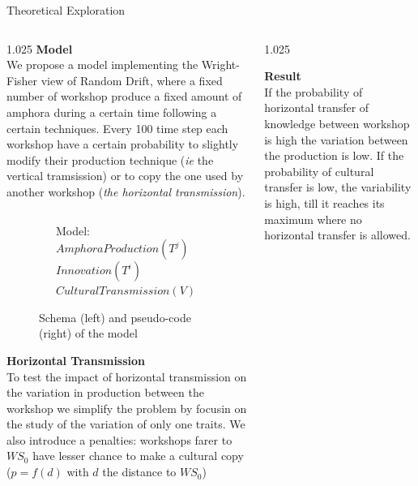 \documentclass[final]{beamer}
\newlength{\sepwid}
\newlength{\onecolwid}
\newlength{\twocolwid}
\begin{document}
\begin{frame}[t]
\begin{columns}[t]
\begin{column}{\twocolwid}
\begin{block}{Theoretical Exploration}
\begin{columns}[t,totalwidth=\twocolwid]
\begin{column}{1.025\onecolwid}
{\textbf{Model}}\\
\justify
We propose a model implementing the Wright-Fisher view of Random Drift, where a fixed number of workshop produce a fixed amount of amphora during a certain time following a certain techniques. Every 100 time step each workshop have a certain probability to slightly modify their production technique (\emph{ie} the vertical tramsission) or to copy the one used by another workshop (\emph{the horizontal transmission}). 
	\begin{figure}
\begin{columns}
    \begin{column}{.6\textwidth}
	    \centering
	\resizebox{\textwidth}{!}{
	    
}
	    \label{fig:mod}
    \end{column}
    \begin{column}{.4\textwidth}
	\begin{algorithmic}
	    \tiny
	    \State Model:
	    \State $AmphoraProduction(T^j)$
	    \State $Innovation(T^i)$
	    \State $CulturalTransmission(V)$
	    \EndIf
	    \EndFor
	    \EndLoop
	\end{algorithmic}
    \end{column}
\end{columns}

	    \caption{Schema (left) and pseudo-code (right) of the model }
	\end{figure}

{\textbf{Horizontal Transmission}}\\
\justify
To test the impact of horizontal transmission on the variation in production between the workshop we simplify the problem by focusin on the study of the variation of only one traits. We also introduce a penalties: workshops farer to $WS_0$ have lesser chance to make a cultural copy ($p=f(d)$ with $d$ the distance to $WS_0$)



\end{column}


\begin{column}{1.025\onecolwid} %
\justify

{\textbf{Result}}\\
\justify
If the probability of horizontal transfer of knowledge between workshop is high the variation between the production is low. If the probability of cultural transfer is low, the variability is high, till it reaches its maximum where no horizontal transfer is allowed.


\end{column}
\end{columns}
\end{block}
\end{column}
\end{columns}
\end{frame}
\end{document}
